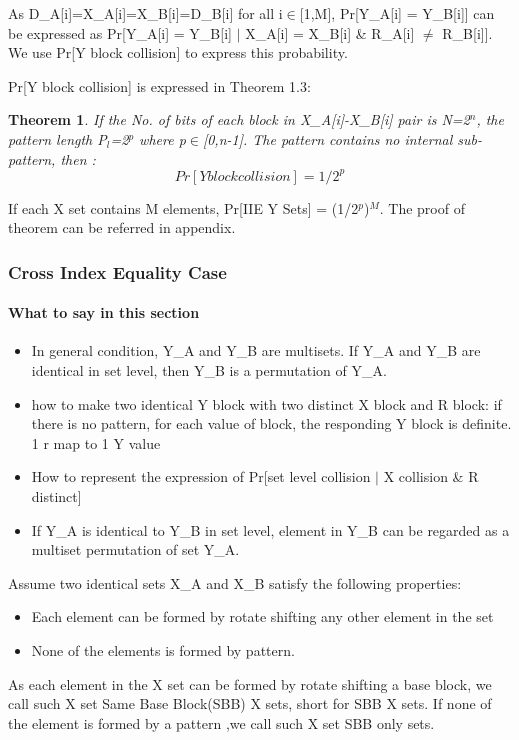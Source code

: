 \documentclass{article}
\newtheorem{theorem}{Theorem}[section]
\begin{document}
As D\_A[i]=X\_A[i]=X\_B[i]=D\_B[i] for all i$\in$[1,M], Pr[Y\_A[i] = Y\_B[i]] can be expressed as Pr[Y\_A[i] = Y\_B[i] $\mid$ X\_A[i] = X\_B[i] \& R\_A[i] $\neq$ R\_B[i]]. We use Pr[Y block collision] to express this probability. 

Pr[Y block collision] is expressed in Theorem 1.3:
\begin{theorem}
If the No. of bits of each block in X\_A[i]-X\_B[i] pair is N=2$^n$, the pattern length P$_l$=2$^p$ where p$\in$[0,n-1]. The pattern contains no internal sub-pattern, then :
\begin{displaymath}
Pr[Y block collision] = 1/2^p
\end{displaymath}

\end{theorem}
If each X set contains M elements, Pr[IIE Y Sets] = (1/2$^p$)$^M$.
The proof of theorem can be referred in appendix.

\subsubsection{Cross Index Equality Case}
\paragraph{What to say in this section}
\begin{itemize}
	\item In general condition, Y\_A and Y\_B are multisets. If Y\_A and Y\_B are identical in set level, then Y\_B is a permutation of Y\_A.
	\item how to make two identical Y block with two distinct X block and R block: if there is no pattern, for each value of block, the responding Y block is definite. 1 r map to 1 Y value
	\item How to represent the expression of Pr[set level collision $\mid$ X collision \& R distinct]
	\item If Y\_A is identical to Y\_B in set level, element in Y\_B can be regarded as a multiset permutation of set Y\_A.
\end{itemize}

Assume two identical sets X\_A and X\_B satisfy the following properties:
\begin{itemize}
	\item Each element can be formed by rotate shifting any other element in the set
	\item None of the elements is formed by pattern.
\end{itemize}
As each element in the X set can be formed by rotate shifting a base block, we call such X set Same Base Block(SBB) X sets, short for SBB X sets. If none of the element is formed by a pattern ,we call such X set SBB only sets.
\end{document}
